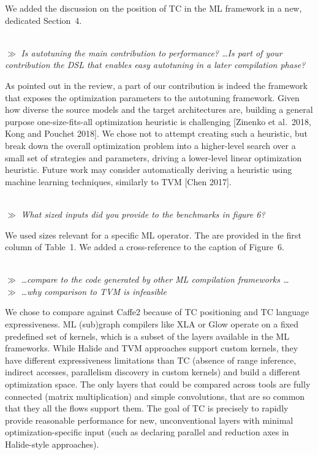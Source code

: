 \documentclass[letterpaper,11pt]{article}
\newcommand{\rev}[1]{~\\[0.5cm]{\tiny $\gg$} {\it #1}}
\newcommand{\cont}{\textlangle{}\dots\textrangle{}}
\begin{document}
We added the discussion on the position of TC in the ML framework in a
new, dedicated Section~4.

\rev{Is autotuning the main contribution to performance?  \cont Is part of your
contribution the DSL that enables easy autotuning in a later compilation phase?}

As pointed out in the review, a part of our contribution is indeed the
framework that exposes the optimization parameters to the autotuning
framework.  Given how diverse the source models and the target
architectures are, building a general purpose one-size-fits-all
optimization heuristic is challenging [Zinenko et al.\ 2018, Kong and
  Pouchet 2018].  We chose not to attempt creating such a heuristic,
but break down the overall optimization problem into a higher-level
search over a small set of strategies and parameters, driving a
lower-level linear optimization heuristic.  Future work may consider
automatically deriving a heuristic using machine learning techniques,
similarly to TVM [Chen 2017].

\rev{What sized inputs did you provide to the benchmarks in figure 6?}

We used sizes relevant for a specific ML operator.  The are provided in the
first column of Table~1.  We added a cross-reference to the caption of Figure~6.


\rev{\cont compare to the code generated by other ML compilation frameworks \cont}
\vspace{-0.5cm}
\rev{\cont why comparison to TVM is infeasible}

We chose to compare against Caffe2 because of TC positioning and TC language
expressiveness. ML (sub)graph compilers like XLA or Glow operate on a fixed
predefined set of kernels, which is a subset of the layers available in the ML
frameworks.  While Halide and TVM approaches support custom kernels, they have
different expressiveness limitations than TC (absence of range inference,
indirect accesses, parallelism discovery in custom kernels) and build a
different optimization space.  The only layers that could be compared across
tools are fully connected (matrix multiplication) and simple convolutions, that
are so common that they all the flows support them.  The goal of TC is
precisely to rapidly provide reasonable performance for new, unconventional
layers with minimal optimization-specific input (such as declaring parallel and
reduction axes in Halide-style approaches).
\end{document}
